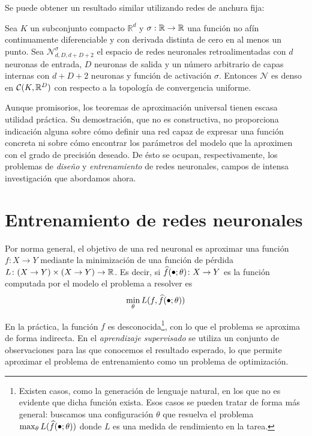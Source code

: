 Se puede obtener un resultado similar utilizando redes de anchura fija:
\begin{theorem}
Sea \( K \) un subconjunto compacto \( \mathbb{R}^d \) y  \( \sigma: \mathbb{R} \to \mathbb{R} \) una función no afín continuamente diferenciable y con derivada distinta de cero en al menos un punto. Sea \( \mathcal{N}^\sigma_{d, D, d + D + 2} \) el espacio de redes neuronales retroalimentadas con \( d \) neuronas de entrada, \( D \) neuronas de salida y un número arbitrario de capas internas con \( d + D + 2\) neuronas y función de activación \( \sigma \). Entonces \( \mathcal{N} \) es denso en \( \mathcal{C} (K, \mathbb{R}^{D}) \) con respecto a la topología de convergencia uniforme.
\end{theorem}

Aunque promisorios, los teoremas de aproximación universal tienen escasa utilidad práctica. Su demostración, que no es constructiva, no proporciona indicación alguna sobre cómo definir una red capaz de expresar una función concreta ni sobre cómo encontrar los parámetros del modelo que la aproximen con el grado de precisión deseado. De ésto se ocupan, respectivamente, los problemas de \textit{diseño} y \textit{entrenamiento} de redes neuronales, campos de intensa investigación que abordamos ahora.

\section{Entrenamiento de redes neuronales}
Por norma general, el objetivo de una red neuronal es aproximar una función \( f \colon X \to Y  \) mediante la minimización de una función de pérdida \( L \colon (X \to Y) \times (X \to Y) \to \mathbb{R} \). Es decir, si \( \widehat{f}(\smallbullet; \theta) \colon X \to Y \) es la función computada por el modelo el problema a resolver es
\begin{equation}
    \min_\theta L(f, \widehat{f}(\smallbullet; \theta))
\end{equation}

En la práctica, la función \( f \) es desconocida\footnote{Existen casos, como la generación de lenguaje natural, en los que no es evidente que dicha función exista. Esos casos se pueden tratar de forma más general: buscamos una configuración \( \theta \) que resuelva el problema \( \max_\theta L(\widehat{f}(\smallbullet; \theta))\) donde \( L \) es una medida de rendimiento en la tarea.}, con lo que el problema se aproxima de forma indirecta. En el \textit{aprendizaje supervisado} se utiliza un conjunto de observaciones para las que conocemos el resultado esperado, lo que permite aproximar el problema de entrenamiento como un problema de optimización.

